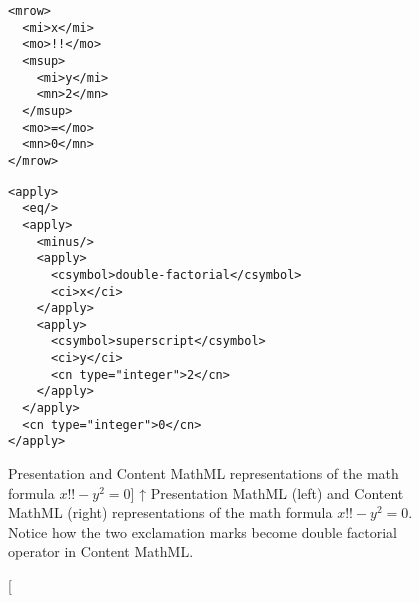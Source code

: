 \begin{figure}
\begingroup
\makeatletter
\let\bfseries\thesis@bfseries@old
\makeatother
\centering
\begin{minipage}{0.27\textwidth}
\begin{verbatim}
<mrow>
  <mi>x</mi>
  <mo>!!</mo>
  <msup>
    <mi>y</mi>
    <mn>2</mn>
  </msup>
  <mo>=</mo>
  <mn>0</mn>
</mrow>
\end{verbatim}
\end{minipage}%
\begin{minipage}{0.73\textwidth}
\begin{verbatim}
<apply>
  <eq/>
  <apply>
    <minus/>
    <apply>
      <csymbol>double-factorial</csymbol>
      <ci>x</ci>
    </apply>
    <apply>
      <csymbol>superscript</csymbol>
      <ci>y</ci>
      <cn type="integer">2</cn>
    </apply>
  </apply>
  <cn type="integer">0</cn>
</apply>
\end{verbatim}
\end{minipage}
\endgroup
\caption
  [Presentation and Content MathML representations of the math formula $x!! - y^2 = 0$]%
  {↑ Presentation MathML (left) and Content MathML (right)
   representations of the math formula $x!! - y^2 = 0$. Notice how the two
   exclamation marks become double factorial operator in Content MathML.
   \cite[Figure 2]{novotny2020three}}
\label{fig:pmml-and-cmml}
\end{figure}
